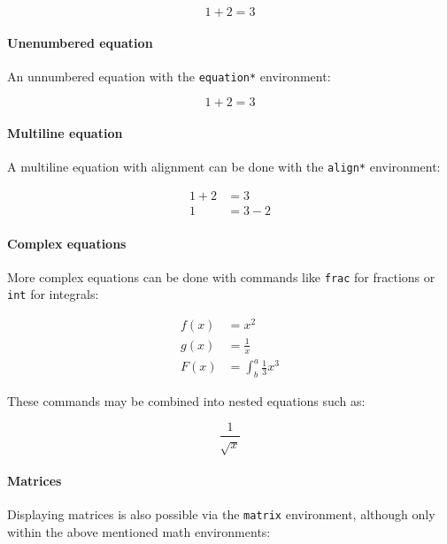 \documentclass{article}
\begin{document}
\begin{equation}
    1 + 2 = 3
\end{equation}

\paragraph{Unenumbered equation}

An unnumbered equation with the \texttt{equation*} environment:

\begin{equation*}
    1 + 2 = 3
\end{equation*}

\paragraph{Multiline equation}

A multiline equation with alignment can be done with the \texttt{align*}
environment:

\begin{align*}
    1 + 2 &= 3 \\
    1 &= 3 - 2
\end{align*}

\paragraph{Complex equations}

More complex equations can be done with commands like \texttt{frac} for
fractions or \texttt{int} for integrals:

\begin{align*}
    f(x) &= x^2 \\
    g(x) &= \frac{1}{x} \\
    F(x) &= \int^a_b \frac{1}{3}x^3
\end{align*}

These commands may be combined into nested equations such as:

\begin{equation*}
    \frac{1}{\sqrt{x}}
\end{equation*}

\paragraph{Matrices}

Displaying matrices is also possible via the \texttt{matrix} environment,
although only within the above mentioned math environments:
\end{document}
